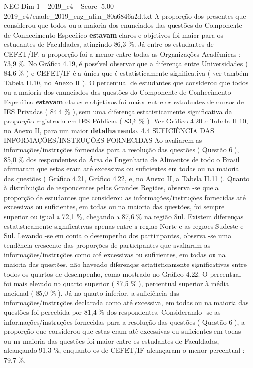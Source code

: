 \begin{textsample}{NEG Dim 1 – 2019\_c4 – Score -5.00 – 2019\_c4/enade\_2019\_eng\_alim\_80a6846a2d.txt}
A proporção dos presentes que considerou que todos ou a maioria dos enunciados das questões do Componente de Conhecimento Específico \textbf{estavam} claros e objetivos foi maior para os estudantes de Faculdades, atingindo 86,3 \%.
Já entre os estudantes de CEFET/IF, a proporção foi a menor entre todas as Organizações Acadêmicas : 73,9 \%.
No Gráfico 4.19, é possível observar que a diferença entre Universidades ( 84,6 \% ) e CEFET/IF é a única que é estatisticamente significativa ( ver também Tabela II.10, no Anexo II ).
O percentual de estudantes que considerou que todos ou a maioria dos enunciados das questões do Componente de Conhecimento Específico \textbf{estavam} claros e objetivos foi maior entre os estudantes de cursos de IES Privadas ( 84,4 \% ), sem uma diferença estatisticamente significativa da proporção registrada em IES Públicas ( 83,6 \% ).
Ver Gráfico 4.20 e Tabela II.10, no Anexo II, para um maior \textbf{detalhamento}. 4.4 SUFICIÊNCIA DAS INFORMAÇÕES/INSTRUÇÕES FORNECIDAS Ao avaliarem as informações/instruções fornecidas para a resolução das questões ( Questão 6 ), 85,0 \% dos respondentes da Área de Engenharia de Alimentos de todo o Brasil afirmaram que estas eram até excessivas ou suficientes em todas ou na maioria das questões ( Gráfico 4.21, Gráfico 4.22, e, no Anexo II, a Tabela II.11 ).
Quanto à distribuição de respondentes pelas Grandes Regiões, observa -se que a proporção de estudantes que considerou as informações/instruções fornecidas até excessivas ou suficientes, em todas ou na maioria das questões, foi sempre superior ou igual a 72,1 \%, chegando a 87,6 \% na região Sul.
Existem diferenças estatisticamente significativas apenas entre a região Norte e as regiões Sudeste e Sul.
Levando -se em conta o desempenho dos participantes, observa -se uma tendência crescente das proporções de participantes que avaliaram as informações/instruções como até excessivas ou suficientes, em todas ou na maioria das questões, não havendo diferenças estatisticamente significativas entre todos os quartos de desempenho, como mostrado no Gráfico 4.22.
O percentual foi mais elevado no quarto superior ( 87,5 \% ), percentual superior à média nacional ( 85,0 \% ).
Já no quarto inferior, a suficiência das informações/instruções declarada como até excessiva, em todas ou na maioria das questões foi percebida por 81,4 \% dos respondentes.
Considerando -se as informações/instruções fornecidas para a resolução das questões ( Questão 6 ), a proporção que considerou que estas eram até excessivas ou suficientes em todas ou na maioria das questões foi maior entre os estudantes de Faculdades, alcançando 91,3 \%, enquanto os de CEFET/IF alcançaram o menor percentual : 79,7 \%.

\end{textsample}
